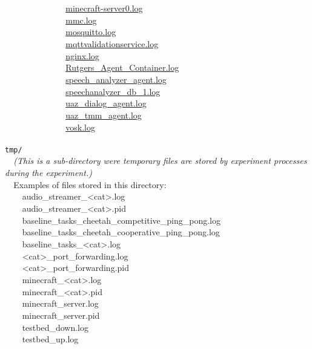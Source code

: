 \verb|              |\hyperref[minecraft-server0.log]{minecraft-server0.log}\\
\verb|              |\hyperref[mmc.log]{mmc.log}\\
\verb|              |\hyperref[mosquitto.log]{mosquitto.log}\\
\verb|              |\hyperref[mqttvalidationservice.log]{mqttvalidationservice.log}\\
\verb|              |\hyperref[nginx.log]{nginx.log}\\
\verb|              |\hyperref[Rutgers_Agent_Container.log]{Rutgers\_Agent\_Container.log}\\
\verb|              |\hyperref[speech_analyzer_agent.log]{speech\_analyzer\_agent.log}\\
\verb|              |\hyperref[speechanalyzer_db_1.log]{speechanalyzer\_db\_1.log}\\
\verb|              |\hyperref[uaz_dialog_agent.log]{uaz\_dialog\_agent.log}\\
\verb|              |\hyperref[uaz_tmm_agent.log]{uaz\_tmm\_agent.log}\\
\verb|              |\hyperref[vosk.log]{vosk.log}\\\\
\verb|tmp/|\\
\verb|  |\textit{(This is a sub-directory were temporary files are stored by experiment processes during the experiment.)}\\
\verb|  |Examples of files stored in this directory:\\
\verb|    |audio\_streamer\_<cat>.log\\
\verb|    |audio\_streamer\_<cat>.pid\\
\verb|    |baseline\_tasks\_cheetah\_competitive\_ping\_pong.log\\
\verb|    |baseline\_tasks\_cheetah\_cooperative\_ping\_pong.log\\
\verb|    |baseline\_tasks\_<cat>.log\\
\verb|    |<cat>\_port\_forwarding.log\\
\verb|    |<cat>\_port\_forwarding.pid\\
\verb|    |minecraft\_<cat>.log\\
\verb|    |minecraft\_<cat>.pid\\
\verb|    |minecraft\_server.log\\
\verb|    |minecraft\_server.pid\\
\verb|    |testbed\_down.log\\
\verb|    |testbed\_up.log\\
